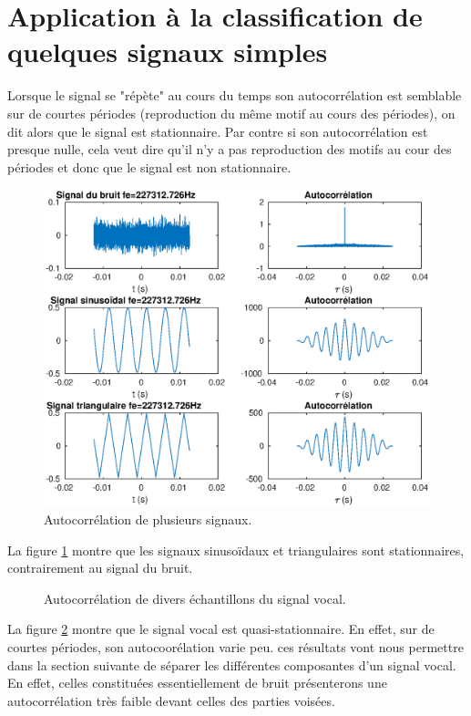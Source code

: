 \documentclass[french]{article}
\begin{document}
\section{ Application à la classification de quelques signaux simples}

Lorsque le signal se "répète" au cours du temps son autocorrélation est semblable sur de courtes périodes (reproduction du même motif au cours des périodes), on dit alors que le signal est stationnaire. Par contre si son autocorrélation est presque nulle, cela veut dire qu'il n'y a pas reproduction des motifs au cour des périodes et donc que le signal est non stationnaire.

\begin{figure}[h!]
	\centering
	\includegraphics[height=0.45\textheight]{images/classificationSig.eps}
	\caption{Autocorrélation de plusieurs signaux.}
	\label{classifSig}
\end{figure}

La figure \ref{classifSig} montre que les signaux sinusoïdaux et triangulaires sont stationnaires, contrairement au signal du bruit.
\FloatBarrier
\begin{figure}[h!]
\centering

\caption{Autocorrélation de divers échantillons du signal vocal.}
\label{classifAh}
\end{figure}

La figure \ref{classifAh} montre que le signal vocal est quasi-stationnaire. En effet, sur de courtes périodes, son autocoorélation varie peu. ces résultats vont nous permettre dans la section suivante de séparer les différentes composantes d'un signal vocal. En effet, celles constituées essentiellement de bruit présenterons une autocorrélation très faible devant celles des parties voisées.
\end{document}
